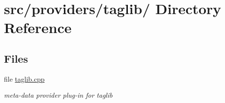 \hypertarget{dir_000043}{
\section{src/providers/taglib/ Directory Reference}
\label{dir_000043}
}
\subsection*{Files}
\begin{CompactItemize}
\item 
file \hyperlink{taglib_8cpp}{taglib.cpp}
\begin{CompactList}\small\item\em meta-data provider plug-in for taglib \item\end{CompactList}

\end{CompactItemize}

